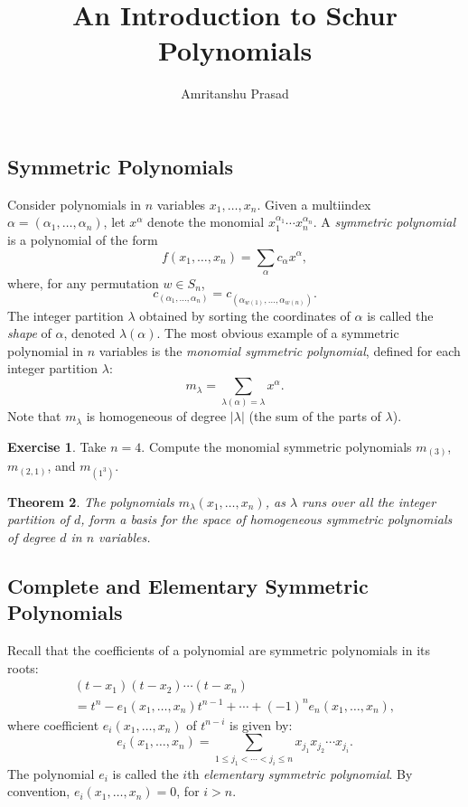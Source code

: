 \documentclass[11pt]{amsproc}
\title{An Introduction to Schur Polynomials}
\author{Amritanshu Prasad}
\newtheorem{theorem}{Theorem}[subsection]
\theoremstyle{definition}
\theoremstyle{example}
\newtheorem{exercise}[theorem]{Exercise}
\begin{document}
\maketitle
\subsection{Symmetric Polynomials}
\label{sec:symmetric-functions}
Consider polynomials in $n$ variables \linebreak $x_1,\dotsc,x_n$.
Given a multiindex $\alpha=(\alpha_1,\dotsc, \alpha_n)$, let $x^\alpha$ denote the monomial $x_1^{\alpha_1}\dotsb x_n^{\alpha_n}$.
A \emph{symmetric polynomial} is a polynomial of the form
\begin{displaymath}
  f(x_1,\dotsc, x_n) = \sum_{\alpha} c_\alpha x^\alpha,
\end{displaymath}
where, for any permutation $w\in S_n$,
\begin{displaymath}
  c_{(\alpha_1,\dotsc,\alpha_n)} = c_{(\alpha_{w(1)},\dotsc,\alpha_{w(n)})}.
\end{displaymath}
The integer partition $\lambda$ obtained by sorting the coordinates of $\alpha$  is called the \emph{shape} of $\alpha$, denoted $\lambda(\alpha)$.
The most obvious example of a symmetric polynomial in $n$ variables is the \emph{monomial symmetric polynomial}, defined for each integer partition $\lambda$:
\begin{displaymath}
  m_\lambda = \sum_{\lambda(\alpha) = \lambda} x^\alpha.
\end{displaymath}
Note that $m_\lambda$ is homogeneous of degree $|\lambda|$ (the sum of the parts of $\lambda$).
\begin{exercise}
  Take $n=4$. Compute the monomial symmetric polynomials $m_{(3)}$, $m_{(2,1)}$, and $m_{(1^3)}$.
\end{exercise}
\begin{theorem}
The polynomials $m_\lambda(x_1,\dotsc,x_n)$, as $\lambda$ runs over all the integer partition of $d$, form a basis for the space of homogeneous symmetric polynomials of degree $d$ in $n$ variables.
\end{theorem}
\subsection{Complete and Elementary Symmetric Polynomials}
\label{sec:compl-elem-symm}
Recall that the coefficients of a polynomial are symmetric polynomials in its roots:
\begin{multline}
  \label{eq:elem-id}
  (t-x_1)(t-x_2)\dotsb (t-x_n) \\= t^n - e_1(x_1,\dotsc, x_n)t^{n-1} + \dotsb + (-1)^n e_n(x_1,\dotsc, x_n),
\end{multline}
where coefficient $e_i(x_1,\dotsc, x_n)$ of $t^{n-i}$ is given by:
\begin{equation}
  \label{eq:elem}
  e_i(x_1,\dotsc, x_n) = \sum_{1\leq j_1<\dotsb<j_i\leq n} x_{j_1}x_{j_2}\dotsb x_{j_i}.
\end{equation}
The polynomial $e_i$ is called the $i$th \emph{elementary symmetric polynomial}.
By convention, $e_i(x_1,\dotsc,x_n)=0$, for $i>n$.
\end{document}
